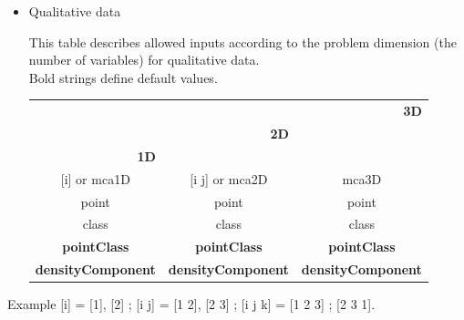 \begin{itemize}





\vspace*{1cm}



\hspace*{-2cm}
\item Qualitative data

This table describes allowed inputs according to the problem dimension (the number of variables) for
qualitative data.\\
Bold strings define default values.







\begin{tabular}{|c|c|c|}

 \hline

 \multicolumn{3}{|r|}{{\bf 3D}} \\

 \cline{1-2}

 \multicolumn{2}{|r|}{{\bf 2D}}& \\

 \cline{1-1}

 \multicolumn{1}{|r|}{{\bf 1D}}& &\\

 \hdashline


 [i] or mca1D& [i j] or mca2D &  mca3D \\

 \hdashline
 point  &  point &  point \\
class & class & class \\
{\bf pointClass} & {\bf pointClass} & {\bf pointClass} \\

\hdashline

{\bf densityComponent} & {\bf densityComponent} &  {\bf densityComponent} \\

\hline

\end{tabular}


\end{itemize}






{\noindent Example [i] = [1], [2] ; [i j] = [1 2], [2 3] ; [i j k] = [1 2 3] ; [2 3 1].}




























